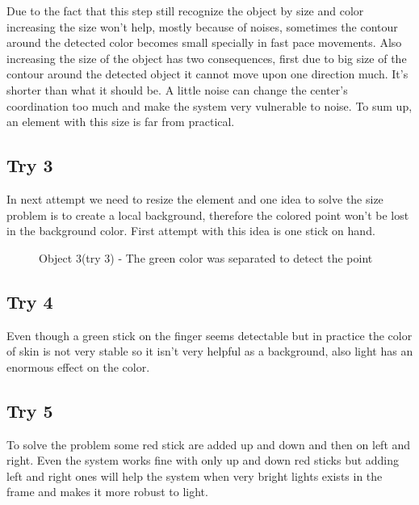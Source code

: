 \documentclass{report}
\begin{document}
Due to the fact that this step still recognize the object by size and color increasing the size won't help, mostly because of noises, sometimes the contour around the detected color becomes small specially in fast pace movements. Also increasing the size of the object has two consequences, first due to big size of the contour around the detected object it cannot move upon one direction much. It's shorter than what it should be. A little noise can change the center's coordination too much and make the system very vulnerable to noise. To sum up, an element with this size is far from practical. 
\subsection{Try 3}
In next attempt we need to resize the element and 
one idea to solve the size problem is to create a local background, therefore the colored point won't be lost in the background color. First attempt with this idea is one stick on hand. \newline

\begin{figure}
	 \caption{Object 3(try 3) - The green color was separated to detect the point}
\end{figure}


\subsection{Try 4}
Even though a green stick on the finger seems detectable but in practice the color of skin is not very stable so it isn't very helpful as a background, also light has an enormous effect on the color.
\subsection{Try 5}
To solve the problem some red stick are added up and down and then on left and right. Even the system works fine with only  up and down red sticks but adding left and right ones will help the system when very bright lights exists in the frame and makes it more robust to light.
\end{document}
